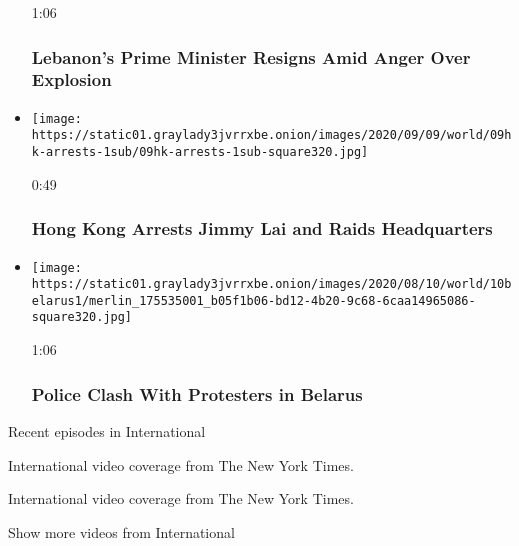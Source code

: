 \begin{itemize}
  1:06

  \hypertarget{lebanons-prime-minister-resigns-amid-anger-over-explosion}{%
  \subsubsection{Lebanon's Prime Minister Resigns Amid Anger Over
  Explosion}\label{lebanons-prime-minister-resigns-amid-anger-over-explosion}}
\item
  \href{https://www.nytimes3xbfgragh.onion/video/us/100000007281530/hong-kong-arrests-jimmy-lai.html?action=click\&module=video-series-bar\&region=header\&pgtype=Article\&playlistId=video/world}{}

  \texttt{[image: https://static01.graylady3jvrrxbe.onion/images/2020/09/09/world/09hk-arrests-1sub/09hk-arrests-1sub-square320.jpg]}

  0:49

  \hypertarget{hong-kong-arrests-jimmy-lai-and-raids-headquarters}{%
  \subsubsection{Hong Kong Arrests Jimmy Lai and Raids
  Headquarters}\label{hong-kong-arrests-jimmy-lai-and-raids-headquarters}}
\item
  \href{https://www.nytimes3xbfgragh.onion/video/world/100000007281204/belarus-election-protests.html?action=click\&module=video-series-bar\&region=header\&pgtype=Article\&playlistId=video/world}{}

  \texttt{[image: https://static01.graylady3jvrrxbe.onion/images/2020/08/10/world/10belarus1/merlin\_175535001\_b05f1b06-bd12-4b20-9c68-6caa14965086-square320.jpg]}

  1:06

  \hypertarget{police-clash-with-protesters-in-belarus}{%
  \subsubsection{Police Clash With Protesters in
  Belarus}\label{police-clash-with-protesters-in-belarus}}
\end{itemize}

Recent episodes in International

International video coverage from The New York Times.

International video coverage from The New York Times.

Show more videos from International

\href{/video}{}

